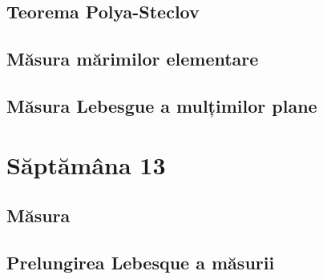 \documentclass[a4paper,12pt]{article}
\theoremstyle{change}
\begin{document}
\subsection{Teorema Polya-Steclov}


\subsection{Măsura mărimilor elementare}

\subsection{Măsura Lebesgue a mulțimilor plane}

\section{Săptămâna 13}


\subsection{Măsura}

\subsection{Prelungirea Lebesque a măsurii}
\end{document}

